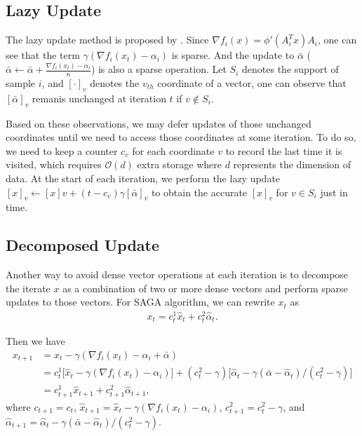 \documentclass{article}
\begin{document}
\subsection{Lazy Update}
The lazy update method is proposed by \cite{schmidt2017}. Since $\nabla f_i(x) = \phi'(A_i^T x) A_i$, one can see that the term $\gamma (\nabla f_i(x_t) - \alpha_i)$ is sparse. And the update to $\bar{\alpha}$ ($\bar{\alpha} \leftarrow \bar{\alpha} + \frac{\nabla f_i(x_t) - \alpha_i}{n}$) is also a sparse operation. Let $S_i$ denotes the support of sample $i$, and $[\cdot]_v$ denotes the $v_{th}$ coordinate of a vector, one can observe that $[\bar{\alpha}]_v$ remanis unchanged at iteration $t$ if $v \notin S_i$.

\bigbreak

Based on these observations, we may defer updates of those unchanged coordinates until we need to access those coordinates at some iteration. To do so, we need to keep a counter $c_v$ for each coordinate $v$ to record the last time it is visited, which requires $\mathcal{O}(d)$ extra storage where $d$ represents the dimension of data. At the start of each iteration, we perform the lazy update $[x]_v \leftarrow [x]v + (t - c_v) \gamma [\bar{\alpha}]_v$ to obtain the accurate $[x]_v$ for $v \in S_i$ just in time.

\subsection{Decomposed Update}
Another way to avoid dense vector operations at each iteration is to decompose the iterate $x$ as a combination of two or more dense vectors and perform sparse updates to those vectors. For SAGA algorithm, we can rewrite $x_t$ as
\begin{equation}
\begin{aligned}
    x_t = c_t^1 \hat{x}_t + c_t^2 \hat{\alpha}_t.
\end{aligned}
\end{equation}

Then we have
\begin{equation}
\begin{aligned}
    x_{t+1} &= x_t - \gamma (\nabla f_i(x_t) - \alpha_i + \bar{\alpha})  \\
            &= c_t^1 \big[ \hat{x}_t - \gamma (\nabla f_i(x_t) - \alpha_i) \big] + (c_t^2 - \gamma) \big[ \hat{\alpha}_t - \gamma (\bar{\alpha} - \hat{\alpha}_t) / (c_t^2 - \gamma) \big] \\
            &= c_{t+1}^1 \hat{x}_{t+1} + c_{t+1}^2 \hat{\alpha}_{t+1},
\end{aligned}
\end{equation}
where $c_{t+1} = c_{t}$, $\hat{x}_{t+1} = \hat{x}_t - \gamma (\nabla f_i(x_t) - \alpha_i)$, $c_{t+1}^2 = c_t^2 - \gamma$, and $\hat{\alpha}_{t+1} = \hat{\alpha}_t - \gamma (\bar{\alpha} - \hat{\alpha}_t) / (c_t^2 - \gamma)$.
\end{document}
